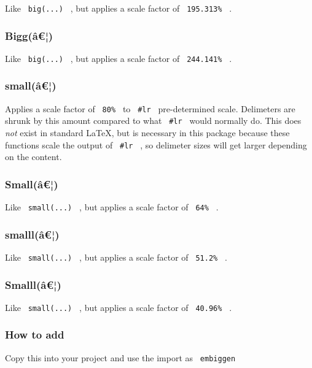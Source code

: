 Like \texttt{\ big(...)\ } , but applies a scale factor of
\texttt{\ 195.313\%\ } .

\subsubsection{Bigg(â€¦)}\label{bigguxe2-1}

Like \texttt{\ big(...)\ } , but applies a scale factor of
\texttt{\ 244.141\%\ } .

\subsubsection{small(â€¦)}\label{smalluxe2}

Applies a scale factor of \texttt{\ 80\%\ } to \texttt{\ \#lr\ }
pre-determined scale. Delimeters are shrunk by this amount compared to
what \texttt{\ \#lr\ } would normally do. This does \emph{not} exist in
standard LaTeX, but is necessary in this package because these functions
scale the output of \texttt{\ \#lr\ } , so delimeter sizes will get
larger depending on the content.

\subsubsection{Small(â€¦)}\label{smalluxe2-1}

Like \texttt{\ small(...)\ } , but applies a scale factor of
\texttt{\ 64\%\ } .

\subsubsection{smalll(â€¦)}\label{smallluxe2}

Like \texttt{\ small(...)\ } , but applies a scale factor of
\texttt{\ 51.2\%\ } .

\subsubsection{Smalll(â€¦)}\label{smallluxe2-1}

Like \texttt{\ small(...)\ } , but applies a scale factor of
\texttt{\ 40.96\%\ } .

\subsubsection{How to add}\label{how-to-add}

Copy this into your project and use the import as \texttt{\ embiggen\ }

